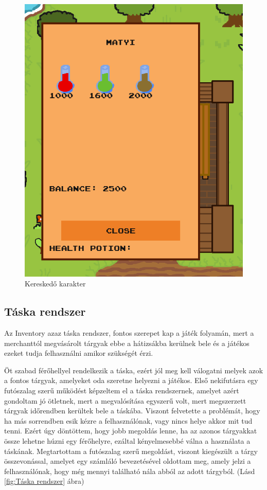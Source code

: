 \begin{figure}[H]
    \centering
    \includegraphics[width=9.0truecm]{images/merchant.png}
    \caption{Kereskedő karakter}
    \label{fig:Merchant}
\end{figure}


\subsection{Táska rendszer}

\indent \indent Az Inventory azaz táska rendszer, fontos szerepet kap a játék folyamán, mert a merchanttól megvásárolt tárgyak ebbe a hátizsákba kerülnek bele és a játékos ezeket tudja felhasználni amikor szükségét érzi.

Öt szabad férőhellyel rendelkezik a táska, ezért jól meg kell válogatni melyek azok a fontos tárgyak, amelyeket oda szeretne helyezni a játékos. Első nekifutásra egy futószalag szerű működést képzeltem el a táska rendszernek, amelyet azért gondoltam jó ötletnek, mert a megvalósítása egyszerű volt, mert megszerzett tárgyak időrendben kerültek bele a táskába. Viszont felvetette a problémát, hogy ha más sorrendben esik kézre a felhasználónak, vagy nincs helye akkor mit tud tenni. Ezért úgy döntöttem, hogy jobb megoldás lenne, ha az azonos tárgyakkat össze lehetne húzni egy férőhelyre, ezáltal kényelmesebbé válna a használata a táskának. Megtartottam a futószalag szerű megoldást, viszont kiegészült a tárgy összevonással, amelyet egy számláló bevezetésével oldottam meg, amely jelzi a felhasználónak, hogy még mennyi található nála abból az adott tárgyból. (Lásd \ref{fig:Táska rendszer} ábra)

